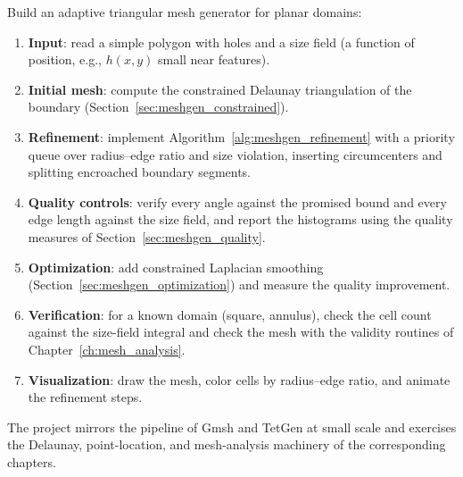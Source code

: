 Build an adaptive triangular mesh generator for planar domains:
\begin{enumerate}
  \item \textbf{Input}: read a simple polygon with holes and a size field
    (a function of position, e.g., $h(x,y)$ small near features).
  \item \textbf{Initial mesh}: compute the constrained Delaunay
    triangulation of the boundary (Section~\ref{sec:meshgen_constrained}).
  \item \textbf{Refinement}: implement
    Algorithm~\ref{alg:meshgen_refinement} with a priority queue over
    radius--edge ratio and size violation, inserting circumcenters and
    splitting encroached boundary segments.
  \item \textbf{Quality controls}: verify every angle against the promised
    bound and every edge length against the size field, and report the
    histograms using the quality measures of Section~\ref{sec:meshgen_quality}.
  \item \textbf{Optimization}: add constrained Laplacian smoothing
    (Section~\ref{sec:meshgen_optimization}) and measure the quality
    improvement.
  \item \textbf{Verification}: for a known domain (square, annulus),
    check the cell count against the size-field integral and check the mesh
    with the validity routines of Chapter~\ref{ch:mesh_analysis}.
  \item \textbf{Visualization}: draw the mesh, color cells by radius--edge
    ratio, and animate the refinement steps.
\end{enumerate}
The project mirrors the pipeline of Gmsh and TetGen at small scale and
exercises the Delaunay, point-location, and mesh-analysis machinery of the
corresponding chapters.
